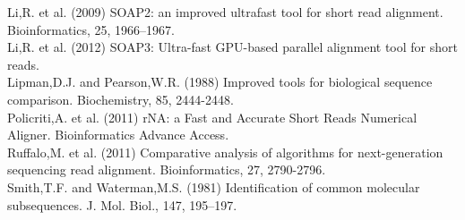 \documentclass[conference]{IEEEtran}
\begin{document}
\begin{thebibliography}{1}
\bibitem{}
Li,R. et al. (2009) SOAP2: an improved ultrafast tool for short read alignment. Bioinformatics, 25, 1966–1967.\\
\bibitem{}
Li,R. et al. (2012) SOAP3: Ultra-fast GPU-based parallel alignment tool for short reads.\\
\bibitem{}
Lipman,D.J. and Pearson,W.R. (1988) Improved tools for biological sequence comparison. Biochemistry, 85, 2444-2448.\\
\bibitem{}
Policriti,A. et al. (2011) rNA: a Fast and Accurate Short Reads Numerical Aligner. Bioinformatics Advance Access.\\
\bibitem{}
Ruffalo,M. et al. (2011) Comparative analysis of algorithms for next-generation sequencing read alignment. Bioinformatics, 27, 2790-2796.\\
\bibitem{}
Smith,T.F. and Waterman,M.S. (1981) Identification of common molecular subsequences. J. Mol. Biol., 147, 195–197.\\
\end{thebibliography}

\end{document}
